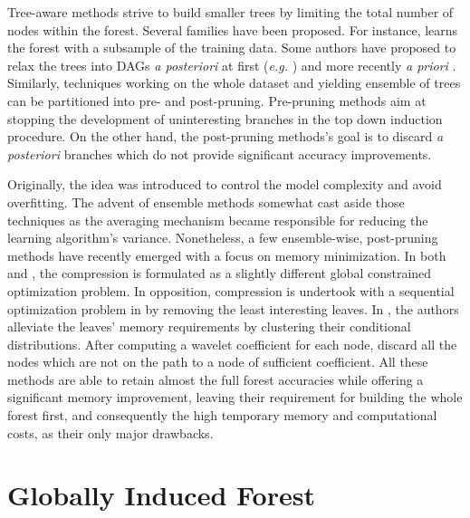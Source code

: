 \documentclass{article}
\begin{document}
Tree-aware methods strive to build smaller trees by limiting the total number 
of nodes within the forest. Several families have been proposed. For instance, 
\citet{breiman1999pasting} learns the forest with a subsample of the training 
data. Some authors have proposed to relax the trees into DAGs {\it a 
posteriori} at first ({\it e.g.} \cite{peterson2009dag}) and more recently {\it 
a priori} \cite{shotton2013jungle}. 
Similarly, techniques working on the whole dataset and yielding ensemble of 
trees can be partitioned into pre- and post-pruning. Pre-pruning methods aim at 
stopping the development of uninteresting branches in the top down induction 
procedure. On the other hand, the post-pruning methods's goal is to discard 
{\it a posteriori} branches which do not provide significant accuracy 
improvements.

Originally, the idea was introduced to control the model complexity and avoid 
overfitting. The advent of ensemble methods somewhat cast aside those 
techniques as the averaging mechanism became responsible for reducing the 
learning algorithm's variance. Nonetheless, a few ensemble-wise, post-pruning 
methods have recently emerged with a focus on memory minimization. In both 
\cite{meinshausen2009forestgarrote} and \cite{l1basedcomp}, the compression 
is formulated as a slightly different global constrained optimization problem. 
In opposition, compression is undertook with a sequential optimization problem 
in \cite{ren2015glorefinement} by removing the least interesting leaves.
In \cite{vleeschouwer2015mitimemreq}, the authors alleviate the leaves' memory 
requirements by clustering their conditional distributions. After computing a 
wavelet coefficient for each node, \citet{elisha2016wavelet} discard all the 
nodes which are not on the path to a node of sufficient coefficient.
All these methods are able to retain almost the full forest accuracies while 
offering a significant memory improvement, leaving their requirement for 
building the whole forest first, and consequently the high temporary memory and 
computational costs, as their only major drawbacks.

\section{Globally Induced Forest}
\label{sec:gif}
\end{document}
